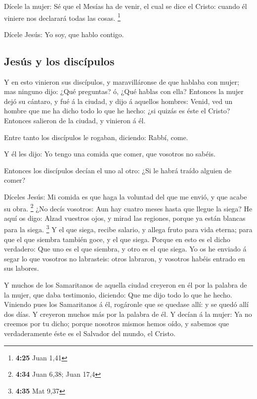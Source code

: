  Dícele la mujer: Sé que el Mesías ha de venir, el cual se
dice el Cristo: cuando él viniere nos declarará todas las cosas.
\footnote{\textbf{4:25} Juan 1,41}

 Dícele Jesús: Yo soy, que hablo contigo.

\hypertarget{jesuxfas-y-los-discuxedpulos}{%
\subsection{Jesús y los discípulos}\label{jesuxfas-y-los-discuxedpulos}}

 Y en esto vinieron sus discípulos, y maravilláronse de que
hablaba con mujer; mas ninguno dijo: ¿Qué preguntas? ó, ¿Qué hablas con
ella?  Entonces la mujer dejó su cántaro, y fué á la
ciudad, y dijo á aquellos hombres:  Venid, ved un hombre
que me ha dicho todo lo que he hecho: ¿si quizás es éste el Cristo?
 Entonces salieron de la ciudad, y vinieron á él.

 Entre tanto los discípulos le rogaban, diciendo: Rabbí,
come.

 Y él les dijo: Yo tengo una comida que comer, que vosotros
no sabéis.

 Entonces los discípulos decían el uno al otro: ¿Si le
habrá traído alguien de comer?

 Díceles Jesús: Mi comida es que haga la voluntad del que
me envió, y que acabe su obra. \footnote{\textbf{4:34} Juan 6,38; Juan
  17,4}  ¿No decís vosotros: Aun hay cuatro meses hasta que
llegue la siega? He aquí os digo: Alzad vuestros ojos, y mirad las
regiones, porque ya están blancas para la siega. \footnote{\textbf{4:35}
  Mat 9,37}  Y el que siega, recibe salario, y allega fruto
para vida eterna; para que el que siembra también goce, y el que siega.
 Porque en esto es el dicho verdadero: Que uno es el que
siembra, y otro es el que siega.  Yo os he enviado á segar
lo que vosotros no labrasteis: otros labraron, y vosotros habéis entrado
en sus labores.

 Y muchos de los Samaritanos de aquella ciudad creyeron en
él por la palabra de la mujer, que daba testimonio, diciendo: Que me
dijo todo lo que he hecho.  Viniendo pues los Samaritanos á
él, rogáronle que se quedase allí: y se quedó allí dos días.
 Y creyeron muchos más por la palabra de él. 
Y decían á la mujer: Ya no creemos por tu dicho; porque nosotros mismos
hemos oído, y sabemos que verdaderamente éste es el Salvador del mundo,
el Cristo.

